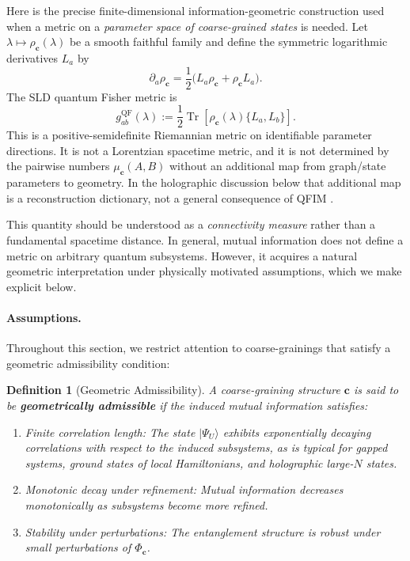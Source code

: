 \documentclass[12pt,a4paper]{article}
\newtheorem{definition}[theorem]{Definition}
\begin{document}
Here is the precise finite-dimensional information-geometric construction used when a metric on a \emph{parameter space of coarse-grained states} is needed.  Let $\lambda\mapsto\rho_{\mathbf c}(\lambda)$ be a smooth faithful family and define the symmetric logarithmic derivatives $L_a$ by
\[
\partial_a\rho_{\mathbf c}
=\frac12\bigl(L_a\rho_{\mathbf c}+\rho_{\mathbf c}L_a\bigr).
\]
The SLD quantum Fisher metric is
\begin{equation}
g^{\mathrm{QF}}_{ab}(\lambda)
:=\frac12\operatorname{Tr}\!\left[
\rho_{\mathbf c}(\lambda)\{L_a,L_b\}\right].
\label{eq:qfim}
\end{equation}
This is a positive-semidefinite Riemannian metric on identifiable parameter directions.  It is not a Lorentzian spacetime metric, and it is not determined by the pairwise numbers $\mu_{\mathbf c}(A,B)$ without an additional map from graph/state parameters to geometry.  In the holographic discussion below that additional map is a reconstruction dictionary, not a general consequence of QFIM \cite{Petz1996}.

This quantity should be understood as a \emph{connectivity measure} rather than a fundamental spacetime distance.
In general, mutual information does not define a metric on arbitrary quantum subsystems.
However, it acquires a natural geometric interpretation under physically motivated assumptions, which we make explicit below.

\paragraph{Assumptions.}
Throughout this section, we restrict attention to coarse-grainings that satisfy a geometric admissibility condition:

\begin{definition}[Geometric Admissibility]
\label{def:geoadmit}
A coarse-graining structure $\mathbf{c}$ is said to be \textbf{geometrically admissible} if the induced mutual information satisfies:
\begin{enumerate}
\item \emph{Finite correlation length:} The state $|\Psi_U\rangle$ exhibits exponentially decaying correlations with respect to the induced subsystems, as is typical for gapped systems, ground states of local Hamiltonians, and holographic large-$N$ states.
\item \emph{Monotonic decay under refinement:} Mutual information decreases monotonically as subsystems become more refined.
\item \emph{Stability under perturbations:} The entanglement structure is robust under small perturbations of $\Phi_{\mathbf{c}}$.
\end{enumerate}
\end{definition}
\end{document}
